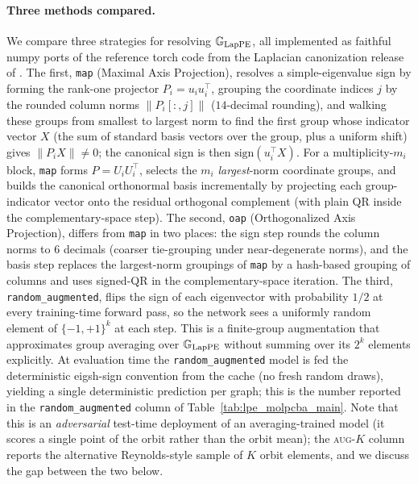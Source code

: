 \documentclass{article}
\begin{document}
\paragraph{Three methods compared.}
We compare three strategies for resolving $\mathbb{G}_{\mathrm{LapPE}}$, all
implemented as faithful numpy ports of the reference torch code from
the Laplacian canonization release of \cite{ma2023laplacian}.
The first, \texttt{map} \cite{ma2023laplacian} (Maximal Axis Projection), resolves a
simple-eigenvalue sign by forming the rank-one projector
$P_i = u_i u_i^{\top}$, grouping the coordinate indices $j$ by the
rounded column norms $\|P_i[:,j]\|$ ($14$-decimal rounding), and
walking these groups from smallest to largest norm to find the first
group whose indicator vector $X$ (the sum of standard basis vectors
over the group, plus a uniform shift) gives $\|P_i X\|\!\neq\!0$; the
canonical sign is then $\mathrm{sign}(u_i^{\top}X)$. For a
multiplicity-$m_i$ block, \texttt{map} forms $P = U_i U_i^{\top}$,
selects the $m_i$ \emph{largest}-norm coordinate groups, and builds
the canonical orthonormal basis incrementally by projecting each
group-indicator vector onto the residual orthogonal complement
(with plain QR inside the complementary-space step).
The second, \texttt{oap} \cite{ma2024canonicalization}   (Orthogonalized Axis Projection), differs
from \texttt{map} in two places: the sign step rounds the column
norms to $6$ decimals (coarser tie-grouping under near-degenerate
norms), and the basis step replaces the largest-norm groupings of
\texttt{map} by a hash-based grouping of columns and uses signed-QR
in the complementary-space iteration.
The third, \texttt{random\_augmented}, flips the sign of each
eigenvector with probability $1/2$ at every training-time forward
pass, so the network sees a uniformly random element of
$\{-1,+1\}^{k}$ at each step. This is a finite-group augmentation
that approximates group averaging over $\mathbb{G}_{\mathrm{LapPE}}$ without
summing over its $2^{k}$ elements explicitly. At evaluation time the
\texttt{random\_augmented} model is fed the deterministic eigsh-sign
convention from the cache (no fresh random draws), yielding a single
deterministic prediction per graph; this is the number reported in
the \texttt{random\_augmented} column of
Table~\ref{tab:lpe_molpcba_main}. Note that this is an
\emph{adversarial} test-time deployment of an averaging-trained model
(it scores a single point of the orbit rather than the orbit mean);
the \textsc{aug-$K$} column reports the alternative Reynolds-style
sample of $K$ orbit elements, and we discuss the gap between the
two below.
\end{document}
